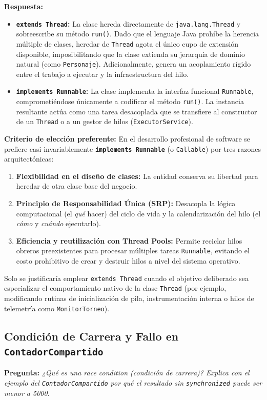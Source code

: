\documentclass[11pt,letterpaper]{article}
\begin{document}
\vspace{0.2cm}
\noindent \textbf{Respuesta:}
\begin{itemize}
    \item \textbf{\texttt{extends Thread}:} La clase hereda directamente de \texttt{java.lang.Thread} y sobreescribe su método \texttt{run()}. Dado que el lenguaje Java prohíbe la herencia múltiple de clases, heredar de \texttt{Thread} agota el único cupo de extensión disponible, imposibilitando que la clase extienda su jerarquía de dominio natural (como \texttt{Personaje}). Adicionalmente, genera un acoplamiento rígido entre el trabajo a ejecutar y la infraestructura del hilo.
    \item \textbf{\texttt{implements Runnable}:} La clase implementa la interfaz funcional \texttt{Runnable}, comprometiéndose únicamente a codificar el método \texttt{run()}. La instancia resultante actúa como una tarea desacoplada que se transfiere al constructor de un \texttt{Thread} o a un gestor de hilos (\texttt{ExecutorService}).
\end{itemize}

\textbf{Criterio de elección preferente:}
En el desarrollo profesional de software se prefiere casi invariablemente \textbf{\texttt{implements Runnable}} (o \texttt{Callable}) por tres razones arquitectónicas:
\begin{enumerate}[label=\alph*)]
    \item \textbf{Flexibilidad en el diseño de clases:} La entidad conserva su libertad para heredar de otra clase base del negocio.
    \item \textbf{Principio de Responsabilidad Única (SRP):} Desacopla la lógica computacional (el \textit{qué} hacer) del ciclo de vida y la calendarización del hilo (el \textit{cómo} y \textit{cuándo} ejecutarlo).
    \item \textbf{Eficiencia y reutilización con Thread Pools:} Permite reciclar hilos obreros preexistentes para procesar múltiples tareas \texttt{Runnable}, evitando el costo prohibitivo de crear y destruir hilos a nivel del sistema operativo.
\end{enumerate}
Solo se justificaría emplear \texttt{extends Thread} cuando el objetivo deliberado sea especializar el comportamiento nativo de la clase \texttt{Thread} (por ejemplo, modificando rutinas de inicialización de pila, instrumentación interna o hilos de telemetría como \texttt{MonitorTorneo}).

\subsection{Condición de Carrera y Fallo en \texttt{ContadorCompartido}}
\textbf{Pregunta:} \textit{¿Qué es una \textit{race condition} (condición de carrera)? Explica con el ejemplo del \texttt{ContadorCompartido} por qué el resultado sin \texttt{synchronized} puede ser menor a 5000.}
\end{document}

